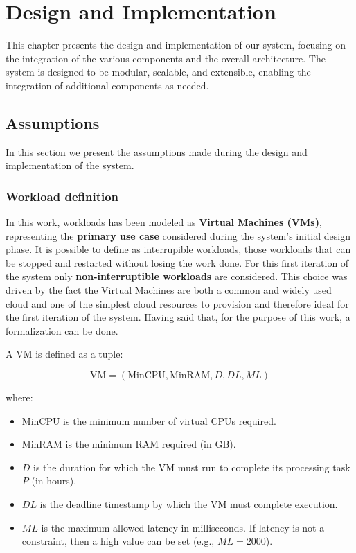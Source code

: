 \chapter{Design and Implementation}
\label{cha:design}

This chapter presents the design and implementation of our system, focusing on the integration of the various components and the overall architecture. The system is designed to be modular, scalable, and extensible, enabling the integration of additional components as needed.

\section{Assumptions}

In this section we present the assumptions made during the design and implementation of the system. 

\subsection{Workload definition}
In this work, workloads has been modeled as \textbf{Virtual Machines (VMs)}, representing the \textbf{primary use case} considered during the system's initial design phase. 
It is possible to define as interrupible workloads, those workloads that can be stopped and restarted without losing the work done. 
For this first iteration of the system only \textbf{non-interruptible workloads} are considered.
This choice was driven by the fact the Virtual Machines are both a common and widely used cloud and one of the simplest cloud resources to provision and therefore ideal for the first iteration of the system.
Having said that, for the purpose of this work, a formalization can be done.

A VM is defined as a tuple:

\[
\text{VM} = (\text{MinCPU}, \text{MinRAM}, D, DL, ML)
\]

where:
\begin{itemize}[itemsep=0.2pt, topsep=1pt]
    \item \( \text{MinCPU} \) is the minimum number of virtual CPUs required.
    \item \( \text{MinRAM} \) is the minimum RAM required (in GB).
    \item \( D \) is the duration for which the VM must run to complete its processing task \( P \) (in hours).
    \item \( DL \) is the deadline timestamp by which the VM must complete execution.
    \item \( ML \) is the maximum allowed latency in milliseconds. If latency is not a constraint, then a high value can be set (e.g., \( ML = 2000 \)). \\
\end{itemize}

